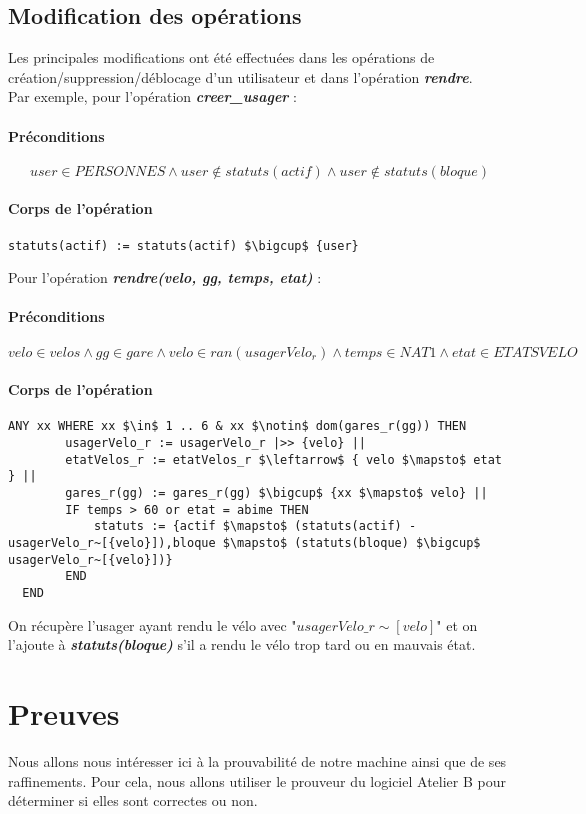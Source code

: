 \documentclass[12pt]{article}
\begin{document}
\subsection{Modification des opérations}
Les principales modifications ont été effectuées dans les opérations de création/suppression/déblocage d’un utilisateur et dans l’opération \textit{\textbf{rendre}}. \\

Par exemple, pour l'opération \textit{\textbf{creer\_usager}} :
\paragraph{Préconditions}
\[user \in PERSONNES \land user \notin statuts(actif) \land user \notin statuts(bloque)\]
\paragraph{Corps de l'opération}
\textbf{}
\begin{lstlisting}[mathescape]
  statuts(actif) := statuts(actif) $\bigcup$ {user}
\end{lstlisting}
\newpage
Pour l'opération \textit{\textbf{rendre(velo, gg, temps, etat)}} :
\paragraph{Préconditions}
\[ velo \in velos \land gg \in gare \land velo \in ran(usagerVelo_r) \land temps \in NAT1 \land etat \in ETATSVELO\]
\paragraph{Corps de l'opération}
\textbf{}
\begin{lstlisting}[mathescape]
  ANY xx WHERE xx $\in$ 1 .. 6 & xx $\notin$ dom(gares_r(gg)) THEN
        usagerVelo_r := usagerVelo_r |>> {velo} ||
        etatVelos_r := etatVelos_r $\leftarrow$ { velo $\mapsto$ etat } ||
        gares_r(gg) := gares_r(gg) $\bigcup$ {xx $\mapsto$ velo} ||
        IF temps > 60 or etat = abime THEN
            statuts := {actif $\mapsto$ (statuts(actif) - usagerVelo_r~[{velo}]),bloque $\mapsto$ (statuts(bloque) $\bigcup$ usagerVelo_r~[{velo}])}
        END
  END
\end{lstlisting}

On récupère l'usager ayant rendu le vélo avec "$usagerVelo\_r\sim[{velo}]$" et on l'ajoute à \textit{\textbf{statuts(bloque)}} s'il a rendu le vélo trop tard ou en mauvais état.
\newpage
\section{Preuves}
Nous allons nous intéresser ici à la prouvabilité de notre machine ainsi que de ses raffinements. Pour cela, nous allons utiliser le prouveur du logiciel Atelier B pour déterminer si elles sont correctes ou non.\\
\end{document}
